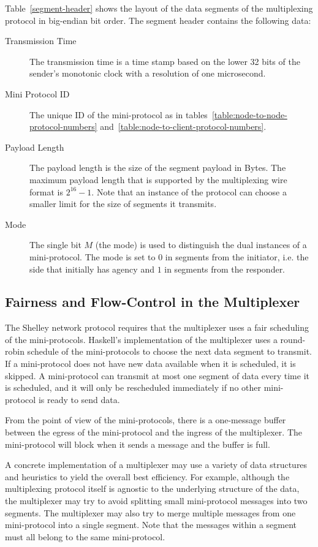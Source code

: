 Table~\ref{segment-header} shows the layout of the data segments of the multiplexing protocol
in big-endian bit order.  The segment header contains the following data:
\begin{description}
\item[Transmission Time]
  The transmission time is a time stamp based on the lower 32 bits of the sender's monotonic clock with a
  resolution of one microsecond.
\item[Mini Protocol ID] The unique ID of the mini-protocol as in
  tables~\ref{table:node-to-node-protocol-numbers}
    and~\ref{table:node-to-client-protocol-numbers}.
\item[Payload Length] The payload length is the size of the segment payload in Bytes.
  The maximum payload length that is supported by the multiplexing wire format is $2^{16}-1$.
  Note that an instance of the protocol can choose a smaller limit for the size of segments it transmits.
\item[Mode] The single bit $M$ (the mode) is used to distinguish the dual instances of a mini-protocol.
  The mode is set to $0$ in segments from the initiator, i.e. the side that initially has agency and
  $1$ in segments from the responder.
\end{description}

\subsection{Fairness and Flow-Control in the Multiplexer}
The Shelley network protocol requires that the multiplexer uses a fair
scheduling of the mini-protocols.  Haskell's implementation of the
multiplexer uses a round-robin schedule of the mini-protocols to choose the
next data segment to transmit.  If a mini-protocol does not have new data
available when it is scheduled, it is skipped.  A mini-protocol can transmit at
most one segment of data every time it is scheduled, and it will only be
rescheduled immediately if no other mini-protocol is ready to send data.

From the point of view of the mini-protocols, there is a one-message buffer between the egress of
the mini-protocol and the ingress of the multiplexer.
The mini-protocol will block when it sends a message and the buffer is full.

A concrete implementation of a multiplexer may use a variety of data structures and heuristics to
yield the overall best efficiency.
For example, although the multiplexing protocol itself is agnostic to the underlying structure of
the data, the multiplexer may try to avoid splitting small mini-protocol messages into two segments.
The multiplexer may also try to merge multiple messages from one mini-protocol into a
single segment.
Note that the messages within a segment must all belong to the same mini-protocol.

